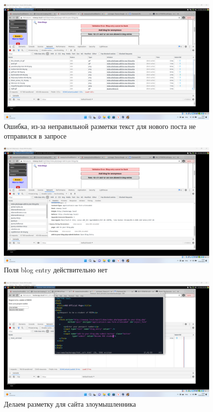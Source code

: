 \documentclass[a4paper]{article}
\begin{document}
  \begin{figure}[H]
    \centering
    \includegraphics[width=\textwidth]{Screenshot_47}
    \caption{Ошибка, из-за неправильной разметки текст для нового поста не отправился в запросе}
  \end{figure}

  \begin{figure}[H]
    \centering
    \includegraphics[width=\textwidth]{Screenshot_48}
    \caption{Поля blog entry действительно нет}
  \end{figure}

  \begin{figure}[H]
    \centering
    \includegraphics[width=\textwidth]{Screenshot_51}
    \caption{Делаем разметку для сайта злоумышленника}
  \end{figure}
\end{document}
